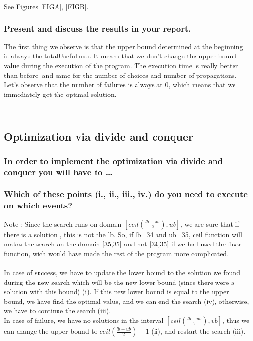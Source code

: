 \documentclass[a4paper ,12pt,french]{article}
\begin{document}
See Figures \ref{FIGA}, \ref{FIGB}.
\subsubsection{Present and discuss the results in your report.}

The first thing we observe is that the upper bound determined at the beginning is always the totalUsefulness. It means that we don't change the upper bound value during the execution of the program.
The execution time is really better than before, and same for the number of choices and number of propagations. Let's observe that the number of failures is always at 0, which means that we  immediately get the optimal solution.


\newpage
\
\newpage

\subsection{Optimization via divide and conquer}

\subsubsection{In order to implement the optimization via divide and conquer you will have to \dots}

\subsubsection{Which of these points (i., ii., iii., iv.) do you need to execute on which events?}
Note : Since the search runs on domain $[ceil(\frac{lb + ub}{2}),ub]$, we are sure that if there is a solution , this is not the lb. So, if lb=34 and ub=35, ceil function will makes the search on the domain [35,35] and not [34,35] if we had used the floor function, wich would have made the rest of the program more complicated.\\\\

In case of success, we have to update the lower bound to the solution we found during the new search which will be the new lower bound (since there were a solution with this bound) (i). If this new lower bound is equal to the upper bound, we have find the optimal value, and we can end the search (iv), otherwise, we have to continue the search (iii).\\

In case of failure, we have no solutions in the interval $[ceil(\frac{lb + ub}{2}),ub]$, thus we can change the upper bound to $ceil(\frac{lb + ub}{2})-1$ (ii), and restart the search (iii).\\
\end{document}
